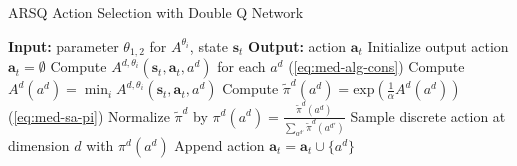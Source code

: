 \begin{algorithm}[h]
    \caption{ARSQ Action Selection with Double Q Network}
    \label{pse:med-alg-act}
\begin{algorithmic}
    \STATE \textbf{Input:} parameter $\theta_{1, 2}$ for $A^{\theta_i}$, state $\mathbf{s}_t$
    \STATE \textbf{Output:} action $\mathbf{a}_t$
    \STATE Initialize output action $\mathbf{a}_t = \emptyset$
        \STATE Compute $A^{d, \theta_i}(\mathbf{s}_t, \mathbf{a}_t, a^d )$ for each $a^d$ (\ref{eq:med-alg-cons})
        \STATE Compute $A^{d}(a^d ) = \min_i A^{d, \theta_i}(\mathbf{s}_t, \mathbf{a}_t, a^d )$
        \STATE Compute $\tilde{\pi}^d(a^d)= \text{exp} \left( \frac{1}{\alpha} A^{d}(a^d ) \right)$ (\ref{eq:med-sa-pi})
        \STATE Normalize $\tilde{\pi}^d$ by $\pi^d(a^d)=\frac{\tilde{\pi}^d (a^d)}{\sum_{a^{d'}} \tilde{\pi}^d(a^{d'})} $
        \STATE Sample discrete action at dimension $d$ with $\pi^d(a^d)$
        \STATE Append action $\mathbf{a}_t = \mathbf{a}_t \cup \{ a^d \}$
    \ENDFOR
\end{algorithmic}
\end{algorithm}